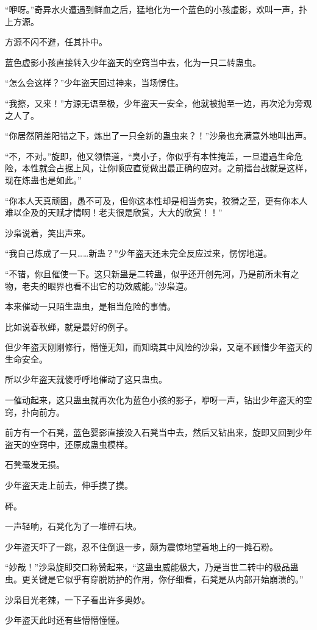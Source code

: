 \begin{this_body}
“咿呀。”奇异水火遭遇到鲜血之后，猛地化为一个蓝色的小孩虚影，欢叫一声，扑上方源。

方源不闪不避，任其扑中。

蓝色虚影小孩直接转入少年盗天的空窍当中去，化为一只二转蛊虫。

“怎么会这样？”少年盗天回过神来，当场愣住。

“我擦，又来！”方源无语至极，少年盗天一安全，他就被抛至一边，再次沦为旁观之人了。

“你居然阴差阳错之下，炼出了一只全新的蛊虫来？！”沙枭也充满意外地叫出声。

“不，不对。”旋即，他又领悟道，“臭小子，你似乎有本性掩盖，一旦遭遇生命危险，本性就会占据上风，让你顺应直觉做出最正确的应对。之前擂台战就是这样，现在炼蛊也是如此。”

“你本人天真顽固，愚不可及，但你这本性却是相当务实，狡猾之至，更有你本人难以企及的天赋才情啊！老夫很是欣赏，大大的欣赏！！”

沙枭说着，笑出声来。

“我自己炼成了一只……新蛊？”少年盗天还未完全反应过来，愣愣地道。

“不错，你且催使一下。这只新蛊是二转蛊，似乎还开创先河，乃是前所未有之物，老夫的眼界也看不出它的功效威能。”沙枭道。

本来催动一只陌生蛊虫，是相当危险的事情。

比如说春秋蝉，就是最好的例子。

但少年盗天刚刚修行，懵懂无知，而知晓其中风险的沙枭，又毫不顾惜少年盗天的生命安全。

所以少年盗天就傻呼呼地催动了这只蛊虫。

一催动起来，这只蛊虫就再次化为蓝色小孩的影子，咿呀一声，钻出少年盗天的空窍，扑向前方。

前方有一个石凳，蓝色婴影直接没入石凳当中去，然后又钻出来，旋即又回到少年盗天的空窍中，还原成蛊虫模样。

石凳毫发无损。

少年盗天走上前去，伸手摸了摸。

砰。

一声轻响，石凳化为了一堆碎石块。

少年盗天吓了一跳，忍不住倒退一步，颇为震惊地望着地上的一摊石粉。

“妙哉！”沙枭旋即交口称赞起来，“这蛊虫威能极大，乃是当世二转中的极品蛊虫。更关键是它似乎有穿脱防护的作用，你仔细看，石凳是从内部开始崩溃的。”

沙枭目光老辣，一下子看出许多奥妙。

少年盗天此时还有些懵懵懂懂。


\end{this_body}
